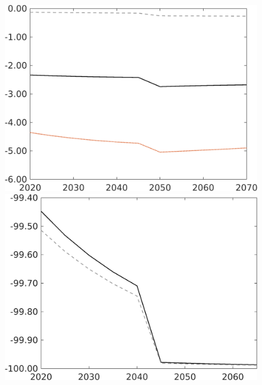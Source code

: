 \begin{figure}[h!!!]
\begin{minipage}[]{0.32\textwidth}
	\end{minipage}
	\begin{minipage}[]{0.32\textwidth}
		\includegraphics[width=1\textwidth]{../../codding_model/own_basedOnFried/optimalPol_010922_revision/figures/all_13Sept22_Tplus30/hl_PercentageLFDynNT_Target_regime0_spillover0_noskill0_sep0_xgrowth0_PV1_etaa0.79_lgd0.png}
	\end{minipage}
	\begin{minipage}[]{0.32\textwidth}
		\includegraphics[width=1\textwidth]{../../codding_model/own_basedOnFried/optimalPol_010922_revision/figures/all_13Sept22_Tplus30/gAf_PercentageLFDynNT_noeff_Target_regime0_spillover0_knspil0_noskill0_sep0_xgrowth0_PV1_etaa0.79_lgd0.png}

\end{minipage}
\end{figure}
